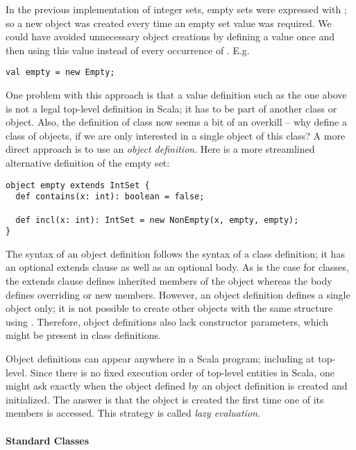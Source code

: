 \documentclass[a4paper,12pt,twoside,titlepage]{book}
\begin{document}
In the previous implementation of integer sets, empty sets were
expressed with ; so a new object was created every time
an empty set value was required. We could have avoided unnecessary
object creations by defining a value  once and then using
this value instead of every occurrence of . E.g.
\begin{lstlisting}
val empty = new Empty;
\end{lstlisting}
One problem with this approach is that a value definition such as the
one above is not a legal top-level definition in Scala; it has to be
part of another class or object. Also, the definition of class
 now seems a bit of an overkill -- why define a class of objects, 
if we are only interested in a single object of this class? A more
direct approach is to use an {\em object definition}. Here is
a more streamlined alternative definition of the empty set:
\begin{lstlisting}
object empty extends IntSet {
  def contains(x: int): boolean = false;

  def incl(x: int): IntSet = new NonEmpty(x, empty, empty);
}
\end{lstlisting}
The syntax of an object definition follows the syntax of a class
definition; it has an optional extends clause as well as an optional
body. As is the case for classes, the extends clause defines inherited
members of the object whereas the body defines overriding or new
members.  However, an object definition defines a single object only;
it is not possible to create other objects with the same structure
using .  Therefore, object definitions also lack constructor
parameters, which might be present in class definitions.

Object definitions can appear anywhere in a Scala program; including
at top-level.  Since there is no fixed execution order of top-level
entities in Scala, one might ask exactly when the object defined by an
object definition is created and initialized. The answer is that the
object is created the first time one of its members is accessed. This
strategy is called {\em lazy evaluation}.

\paragraph{Standard Classes}
\end{document}
